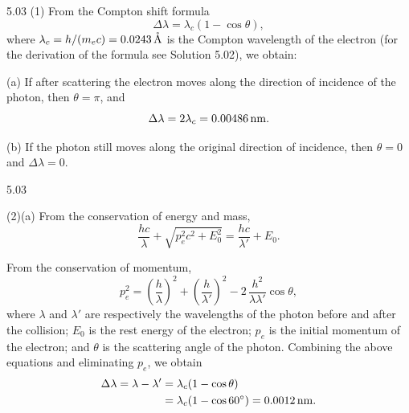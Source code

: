 \begin{solution}{5.03}
(1) From the Compton shift formula
\begin{equation*}
\Delta\lambda = \lambda_c(1 - \cos\theta),
\end{equation*}
where $\lambda_c = h/(m_ec) = 0.0243\,\mathrm{\mathring{A}}$ is the Compton wavelength of the
electron (for the derivation of the formula see Solution 5.02), we obtain:

(a) If after scattering the electron moves along the direction of incidence of the photon,
then $\theta = \pi$, and
\begin{equation*}
\Delta\lambda = 2\lambda_c = 0.00486\,\mathrm{nm}.
\end{equation*}

(b) If the photon still moves along the original direction of incidence, then $\theta = 0$ and
$\Delta\lambda = 0$.

\begin{figbox}{5.03}
\end{figbox}

(2)(a) From the conservation of energy and mass,
\begin{equation*}
\frac{hc}{\lambda} + \sqrt{p_e^2c^2 + E_0^2} = \frac{hc}{\lambda'} + E_0.
\end{equation*}

From the conservation of momentum,
\begin{equation*}
p_e^2 = \left(\frac{h}{\lambda}\right)^2 + \left(\frac{h}{\lambda'}\right)^2
      - 2\,\frac{h^2}{\lambda\lambda'}\cos\theta,
\end{equation*}
where $\lambda$ and $\lambda'$ are respectively the wavelengths of the photon before and after
the collision; $E_0$ is the rest energy of the electron; $p_e$ is the initial momentum of the
electron; and $\theta$ is the scattering angle of the photon. Combining the above equations
and eliminating $p_e$, we obtain
\begin{align*}
\Delta\lambda = \lambda - \lambda' &= \lambda_c(1 - \cos\theta)\\
&= \lambda_c(1 - \cos 60^{\circ}) = 0.0012\,\mathrm{nm}.
\end{align*}


\end{solution}
